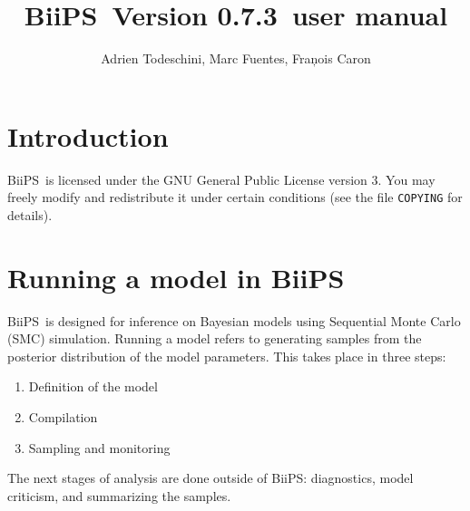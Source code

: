 \documentclass[11pt, a4paper, titlepage]{report}
\newcommand{\biips}{\textsf{BiiPS}}
\newcommand{\release}{0.7.3}
\newcommand{\JAGS}{\textsf{JAGS}}
\newcommand{\rjags}{\textsf{rjags}}
\newcommand{\OpenBUGS}{\textsf{OpenBUGS}}
\newcommand{\R}{\textsf{R}}
\newcommand{\CODA}{\textsf{coda}}
\begin{document}
\title{\biips\ Version \release\ user manual}
\author{Adrien Todeschini, Marc Fuentes, Fran\c{}ois Caron}

\maketitle

\tableofcontents

\chapter{Introduction}

% 

\biips\ is licensed under the GNU General Public License
version 3. You may freely modify and redistribute it under certain
conditions (see the file \texttt{COPYING} for details).

\chapter{Running a model in \biips}

\biips\ is designed for inference on Bayesian models using Sequential
Monte Carlo (SMC) simulation.  Running a model refers to generating
samples from the posterior distribution of the model parameters.  This
takes place in three steps:
\begin{enumerate}
\item Definition of the model
\item Compilation
\item Sampling and monitoring
\end{enumerate}
The next stages of analysis are done outside of \biips: diagnostics,
model criticism, and summarizing the samples.
\end{document}
